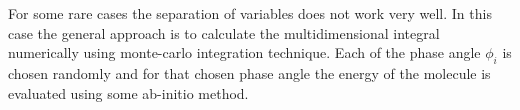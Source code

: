\documentclass[a4paper,12pt]{article}
\begin{document}
For some rare cases the separation of variables does not work very well. In this case the general approach is to calculate the multidimensional integral numerically using monte-carlo integration technique. Each of the phase angle $\phi_i$ is chosen randomly and for that chosen phase angle the energy of the molecule is evaluated using some ab-initio method.

%
%
%
%
%
%
\end{document}
